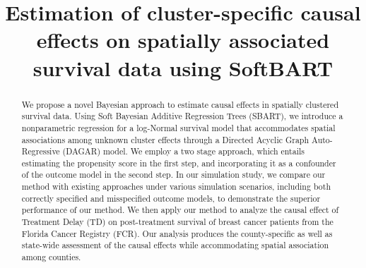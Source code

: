 \documentclass[aoas]{imsart}
\theoremstyle{plain}
\theoremstyle{definition}
\begin{document}
\begin{frontmatter}
\title{Estimation of cluster-specific causal effects on spatially associated  survival data using SoftBART}



\begin{abstract}
We propose a novel Bayesian approach to estimate causal effects in spatially clustered survival data. Using Soft Bayesian Additive Regression Trees (SBART), we introduce a nonparametric regression for a log-Normal survival model that accommodates spatial associations among unknown cluster effects through a Directed Acyclic Graph Auto-Regressive (DAGAR) model. We employ a two stage approach, which entails estimating the propensity score in the first step, and incorporating it as a confounder of the outcome model in the second step.
In our simulation study, we compare our method with existing approaches under various simulation scenarios, including both correctly specified and misspecified outcome models, to demonstrate the superior performance of our method.  We then apply our method to analyze the causal effect of Treatment Delay (TD) on post-treatment survival of breast cancer patients from the Florida Cancer Registry (FCR). 
Our analysis produces the county-specific as well as state-wide assessment of the causal effects while accommodating spatial association among counties.
 
\end{abstract}





\end{frontmatter}
\end{document}
